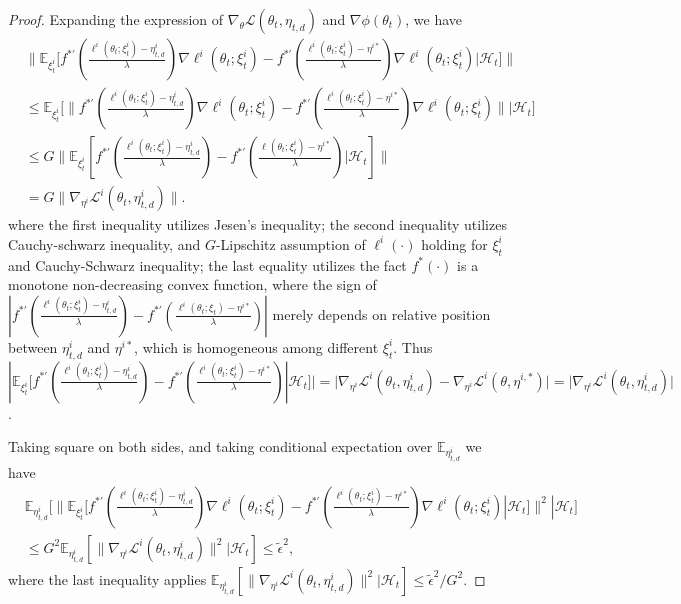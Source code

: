 \documentclass[twoside]{article} %
\theoremstyle{plain}
\theoremstyle{definition}
\theoremstyle{remark}
\newcommand{\tepsilon}{\tilde{\epsilon}}
\newcommand{\fL}{\mathcal{L}}
\newcommand{\calH}{\mathcal{H}}
\begin{document}
\begin{proof}
   Expanding the expression of $\nabla_{\theta}\fL(\theta_t, \eta_{t,d})$ and $\nabla \phi(\theta_t)$, we have
    \begin{align}
        & \|\mathbb{E}_{{\xi}^i_t}\big[f^{*'}(\frac{\ell^i(\theta_t;{\xi}_t^i)-\eta^i_{t,d}}{\lambda})\nabla \ell^i(\theta_t;{\xi}_t^i)-f^{*'}(\frac{\ell^i(\theta_t;{\xi}_t^i)-\eta^{i*}}{\lambda})\nabla\ell^i(\theta_t;{\xi}_t^i)|\calH_t\big] \| \nonumber \\
        &\leq \mathbb{E}_{{\xi}^i_{t}} \big[\|f^{*'}(\frac{\ell^i(\theta_t;{\xi}^i_{t})-\eta^i_{t,d}}{\lambda})\nabla \ell^i(\theta_t;{\xi}^i_t)-f^{*'}(\frac{\ell^i(\theta_t;{\xi}^i_t)-\eta^{i*}}{\lambda})\nabla \ell^i(\theta_t;{\xi}^i_t) \||\calH_t\big] \nonumber \\
        &\leq G\|\mathbb{E}_{{\xi}_{t}^i}[f^{*'}(\frac{\ell^i(\theta_t;{\xi}^i_t)-\eta^i_{t,d}}{\lambda}) - f^{*'}(\frac{\ell(\theta_t;{\xi}_t^i)-\eta^{i*}}{\lambda})|\calH_t]  \| \nonumber\\
        &=G\|\nabla_{\eta^i} \fL^i(\theta_t,\eta^i_{t,d})\|.\nonumber
    \end{align}
    where the first inequality utilizes Jesen's inequality; the second inequality utilizes Cauchy-schwarz inequality, and $G$-Lipschitz assumption of $\ell^i(\cdot)$ holding for $\xi_t^i$ and Cauchy-Schwarz inequality; the last equality utilizes the fact $f^*(\cdot)$ is a monotone non-decreasing convex function, where the sign of
    $|f^{*'}(\frac{\ell^i(\theta_t;{\xi}^i_t)-\eta^i_{t,d}}{\lambda}) - f^{*'}(\frac{\ell^i(\theta_t;{\xi}_t)-\eta^{i*}}{\lambda})|$ merely depends on relative position between $\eta^i_{t,d}$ and $\eta^{i*}$, which is homogeneous among different ${\xi}^i_t$. Thus $|\mathbb{E}_{{\xi}_t^i}[f^{*'}(\frac{\ell^i(\theta_t;{\xi}^i_t)-\eta^i_{t,d}}{\lambda}) - f^{*'}(\frac{\ell^i(\theta_t;{\xi}^i_t)-\eta^{i*}}{\lambda})|\calH_t]|=|\nabla_{\eta^i}\fL^i(\theta_t,\eta^i_{t,d})-\nabla_{\eta^i}\fL^i(\theta,\eta^{i,*})| = |\nabla_{\eta^i}\fL^i(\theta_t,\eta_{t,d}^i)|$. 
    
    Taking square on both sides, and taking conditional expectation over $\mathbb{E}_{\eta_{t,d}^i}$ we have
    \begin{align}
        &\mathbb{E}_{\eta_{t,d}^i}\Big[\|\mathbb{E}_{{\xi}^i_t}\big[f^{*'}(\frac{\ell^i(\theta_t;{\xi}_t^i)-\eta^i_{t,d}}{\lambda})\nabla \ell^i(\theta_t;{\xi}_t^i)-f^{*'}(\frac{\ell^i(\theta_t;{\xi}_t^i)-\eta^{i*}}{\lambda})\nabla\ell^i(\theta_t;{\xi}_t^i)|\calH_t\big] \|^2|\calH_t\Big]\nonumber\\
        &\leq G^2\mathbb{E}_{\eta^i_{t,d}}[\|\nabla_{\eta^i} \fL^i(\theta_t,\eta^i_{t,d})\|^2|\calH_t]\leq \tepsilon^2,\nonumber
    \end{align}
    where the last inequality applies $\mathbb{E}_{\eta^i_{t,d}}[\|\nabla_{\eta^i} \fL^i(\theta_t,\eta^i_{t,d})\|^2|\calH_t]\leq \tepsilon^2/G^2$.
    

\end{proof}
\end{document}
